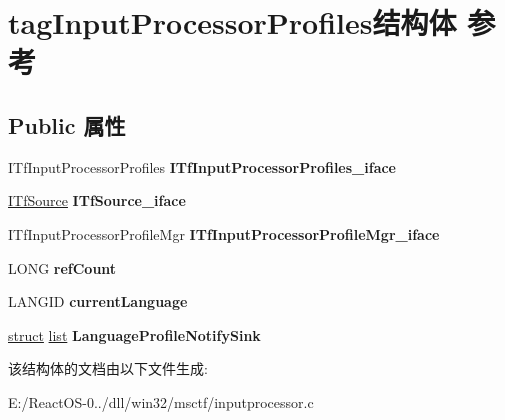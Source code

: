 \hypertarget{structtag_input_processor_profiles}{}\section{tag\+Input\+Processor\+Profiles结构体 参考}
\label{structtag_input_processor_profiles}
\subsection*{Public 属性}
\begin{DoxyCompactItemize}
\item 
\mbox{\label{structtag_input_processor_profiles_a756871021f7674a8fbe3cd7fe00b537d}} 
I\+Tf\+Input\+Processor\+Profiles {\bfseries I\+Tf\+Input\+Processor\+Profiles\+\_\+iface}
\item 
\mbox{\label{structtag_input_processor_profiles_a28d6523a21370c0243a0b02f08094673}} 
\hyperlink{interface_i_tf_source}{I\+Tf\+Source} {\bfseries I\+Tf\+Source\+\_\+iface}
\item 
\mbox{\label{structtag_input_processor_profiles_a7850db375706c7b42409462ec94eb2dc}} 
I\+Tf\+Input\+Processor\+Profile\+Mgr {\bfseries I\+Tf\+Input\+Processor\+Profile\+Mgr\+\_\+iface}
\item 
\mbox{\label{structtag_input_processor_profiles_a2fa2b3409e15d0f37d353e43e7413ed1}} 
L\+O\+NG {\bfseries ref\+Count}
\item 
\mbox{\label{structtag_input_processor_profiles_a05e8640d603d6d433cbaad18dec757a7}} 
L\+A\+N\+G\+ID {\bfseries current\+Language}
\item 
\mbox{\label{structtag_input_processor_profiles_afb33d768889cf07399934ffd9055fd07}} 
\hyperlink{interfacestruct}{struct} \hyperlink{classlist}{list} {\bfseries Language\+Profile\+Notify\+Sink}
\end{DoxyCompactItemize}


该结构体的文档由以下文件生成\+:\begin{DoxyCompactItemize}
\item 
E\+:/\+React\+O\+S-\/0../dll/win32/msctf/inputprocessor.\+c\end{DoxyCompactItemize}
